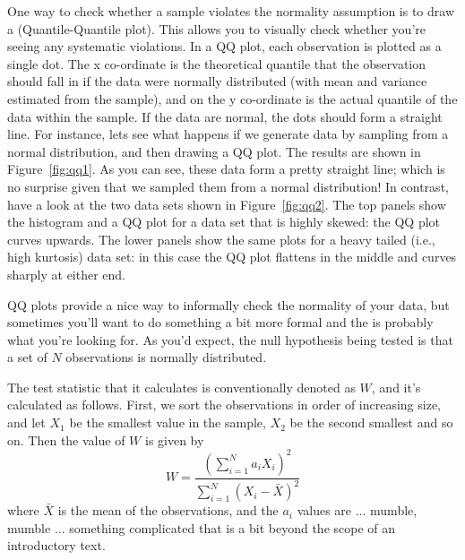 One way to check whether a sample violates the normality assumption is to draw a  (Quantile-Quantile plot). This allows you to visually check whether you're seeing any systematic violations. In a QQ plot, each observation is plotted as a single dot. The x co-ordinate is the theoretical quantile that the observation should fall in if the data were normally distributed (with mean and variance estimated from the sample), and on the y co-ordinate is the actual quantile of the data within the sample. If the data are normal, the dots should form a straight line. For instance, lets see what happens if we generate data by sampling from a normal distribution, and then drawing a QQ plot. The results are shown in Figure~\ref{fig:qq1}. As you can see, these data form a pretty straight line; which is no surprise given that we sampled them from a normal distribution! In contrast, have a look at the two data sets shown in Figure~\ref{fig:qq2}. The top panels show the histogram and a QQ plot for a data set that is highly skewed: the QQ plot curves upwards. The lower panels show the same plots for a heavy tailed (i.e., high kurtosis) data set: in this case the QQ plot flattens in the middle and curves sharply at either end.


QQ plots provide a nice way to informally check the normality of your data, but sometimes you'll want to do something a bit more formal and the  \parencite{Shapiro1965} is probably what you're looking for. As you'd expect, the null hypothesis being tested is that a set of $N$ observations is normally distributed. 

\vspace{0.5cm}
\begin{mdframed}[style=MyFrame,nobreak=true]
The test statistic that it calculates is conventionally denoted as $W$, and it's calculated as follows. First, we sort the observations in order of increasing size, and let $X_1$ be the smallest value in the sample, $X_2$ be the second smallest and so on. Then the value of $W$ is given by
$$
W = \frac{ \left( \sum_{i = 1}^N a_i X_i \right)^2 }{ \sum_{i = 1}^N (X_i - \bar{X})^2}
$$
where $\bar{X}$ is the mean of the observations, and the $a_i$ values are ... mumble, mumble ... something complicated that is a bit beyond the scope of an introductory text. 
\end{mdframed}

